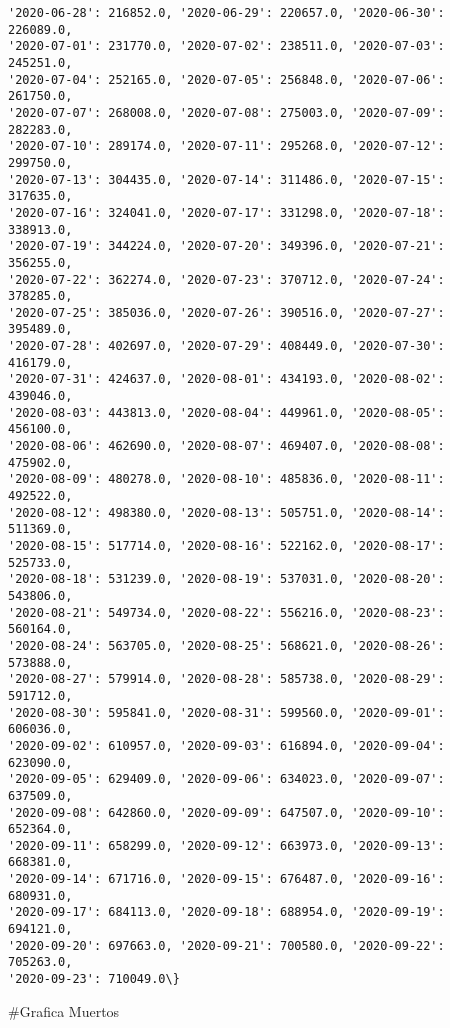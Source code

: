 \documentclass[11pt]{article}
\begin{document}
\begin{Verbatim}[commandchars=\\\{\}]
'2020-06-28': 216852.0, '2020-06-29': 220657.0, '2020-06-30': 226089.0,
'2020-07-01': 231770.0, '2020-07-02': 238511.0, '2020-07-03': 245251.0,
'2020-07-04': 252165.0, '2020-07-05': 256848.0, '2020-07-06': 261750.0,
'2020-07-07': 268008.0, '2020-07-08': 275003.0, '2020-07-09': 282283.0,
'2020-07-10': 289174.0, '2020-07-11': 295268.0, '2020-07-12': 299750.0,
'2020-07-13': 304435.0, '2020-07-14': 311486.0, '2020-07-15': 317635.0,
'2020-07-16': 324041.0, '2020-07-17': 331298.0, '2020-07-18': 338913.0,
'2020-07-19': 344224.0, '2020-07-20': 349396.0, '2020-07-21': 356255.0,
'2020-07-22': 362274.0, '2020-07-23': 370712.0, '2020-07-24': 378285.0,
'2020-07-25': 385036.0, '2020-07-26': 390516.0, '2020-07-27': 395489.0,
'2020-07-28': 402697.0, '2020-07-29': 408449.0, '2020-07-30': 416179.0,
'2020-07-31': 424637.0, '2020-08-01': 434193.0, '2020-08-02': 439046.0,
'2020-08-03': 443813.0, '2020-08-04': 449961.0, '2020-08-05': 456100.0,
'2020-08-06': 462690.0, '2020-08-07': 469407.0, '2020-08-08': 475902.0,
'2020-08-09': 480278.0, '2020-08-10': 485836.0, '2020-08-11': 492522.0,
'2020-08-12': 498380.0, '2020-08-13': 505751.0, '2020-08-14': 511369.0,
'2020-08-15': 517714.0, '2020-08-16': 522162.0, '2020-08-17': 525733.0,
'2020-08-18': 531239.0, '2020-08-19': 537031.0, '2020-08-20': 543806.0,
'2020-08-21': 549734.0, '2020-08-22': 556216.0, '2020-08-23': 560164.0,
'2020-08-24': 563705.0, '2020-08-25': 568621.0, '2020-08-26': 573888.0,
'2020-08-27': 579914.0, '2020-08-28': 585738.0, '2020-08-29': 591712.0,
'2020-08-30': 595841.0, '2020-08-31': 599560.0, '2020-09-01': 606036.0,
'2020-09-02': 610957.0, '2020-09-03': 616894.0, '2020-09-04': 623090.0,
'2020-09-05': 629409.0, '2020-09-06': 634023.0, '2020-09-07': 637509.0,
'2020-09-08': 642860.0, '2020-09-09': 647507.0, '2020-09-10': 652364.0,
'2020-09-11': 658299.0, '2020-09-12': 663973.0, '2020-09-13': 668381.0,
'2020-09-14': 671716.0, '2020-09-15': 676487.0, '2020-09-16': 680931.0,
'2020-09-17': 684113.0, '2020-09-18': 688954.0, '2020-09-19': 694121.0,
'2020-09-20': 697663.0, '2020-09-21': 700580.0, '2020-09-22': 705263.0,
'2020-09-23': 710049.0\}
    \end{Verbatim}

    \#Grafica Muertos
\end{document}
